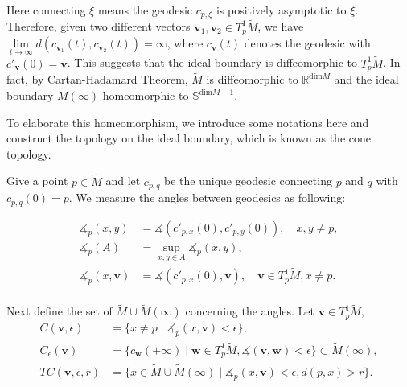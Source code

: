 \documentclass[reqno,11pt]{article}
\theoremstyle{definition}
\theoremstyle{remark}
\numberwithin{equation}{section}
\begin{document}
Here connecting $\xi$ means the geodesic $c_{p,\xi}$ is positively asymptotic to $\xi$. Therefore, given two different vectors $\bm{v}_1,\bm{v}_2\in T_p^1\widetilde{M}$, we have $\lim\limits_{t\to\infty}d(c_{\bm{v}_1}(t),c_{\bm{v}_2}(t))=\infty$, where $c_{\bm{v}}{(t)}$ denotes the geodesic with $c'_{\bm{v}}(0)=\bm{v}$. This suggests that the ideal boundary is diffeomorphic to $T_p^1\widetilde{M}$. In fact, by Cartan-Hadamard Theorem, $\widetilde{M}$ is diffeomorphic to $\mathbb{R}^{\text{dim}M}$ and the ideal boundary $\widetilde{M}(\infty)$ homeomorphic to $\mathbb{S}^{\text{dim}M-1}$.

To elaborate this homeomorphism, we introduce some notations here and construct the topology on the ideal boundary, which is known as the cone topology.

Give a point $p\in\widetilde{M}$ and let $c_{p,q}$ be the unique geodesic connecting $p$ and $q$ with $c_{p,q}(0)=p$. We measure the angles between geodesics as following:

\begin{displaymath}
	\begin{aligned}
		\measuredangle_p(x,y)      & =\measuredangle(c'_{p,x}(0),c'_{p,y}(0)),\quad x,y\neq p,                        \\
		\measuredangle_p(A)        & =\sup\limits_{x,y\in A}\measuredangle_p(x,y),                                    \\
		\measuredangle_p(x,\bm{v}) & =\measuredangle(c'_{p,x}(0),\bm{v}),\quad \bm{v}\in T_p^1\widetilde{M}, x\neq p. \\
	\end{aligned}
\end{displaymath}

Next define the set of $\widetilde{M}\cup\widetilde{M}(\infty)$ concerning the angles. Let $\bm{v}\in T_p^1\widetilde{M}$,
\begin{displaymath}
	\begin{aligned}
		C(\bm{v},\epsilon)    & =\{x\neq p\mid \measuredangle_p(x,\bm{v})<\epsilon\},                                                                         \\
		C_\epsilon(\bm{v})    & =\{c_{\bm{w}}(+\infty)\mid \bm{w}\in T^1_p\widetilde{M},\measuredangle(\bm{v},\bm{w})<\epsilon\}\subset\widetilde{M}(\infty), \\
		TC(\bm{v},\epsilon,r) & =\{x\in\widetilde{M}\cup\widetilde{M}(\infty)\mid \measuredangle_p(x,\bm{v})<\epsilon, d(p,x)> r\}.
	\end{aligned}
\end{displaymath}
\end{document}
